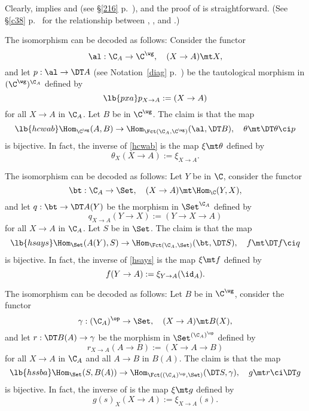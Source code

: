 \documentclass[12pt]{article}
\theoremstyle{remark}
\theoremstyle{definition}
\begin{document}
Clearly,  implies  and  (see \S\ref{216} p.~), and the proof of  is straightforward. (See \S\ref{c38} p.~ for the relationship between , , and .) 

The isomorphism  can be decoded as follows: Consider the functor 
$$
\al:\C_A\to\C^\wg,\quad(X\to A)\mt X,
$$ 
and let $p:\al\to\DT A$ (see Notation~\ref{diag} p.~) be the tautological morphism in $(\C^\wg)^{\C_A}$ defined by 
%
\begin{equation}\lb{pxa}
p_{X\to A}:=(X\to A)
\end{equation}
% 
for all $X\to A$ in $\C_A$. Let $B$ be in $\C^\wg$. The claim is that the map 
\begin{equation}\lb{hcwab}
\Hom_{\C^\wg}(A,B)\to\Hom_{\Fct(\C_A,\C^\wg)}(\al,\DT B),\quad\theta\mt\DT \theta\ci p
\end{equation} 
is bijective. In fact, the inverse of \eqref{hcwab} is the map $\xi\mt\theta$ defined by 
$$
\theta_X(X\to A):=\xi_{X\to A}.
$$

The isomorphism  can be decoded as follows: Let $Y$ be in $\C$, consider the functor 
$$
\bt:\C_A\to\Set,\quad(X\to A)\mt\Hom_\C(Y,X), 
$$ 
and let $q:\bt\to\DT A(Y)$ be the morphism in $\Set^{\C_A}$ defined by 
$$
q_{X\to A}(Y\to X):=(Y\to X\to A)
$$ 
for all $X\to A$ in $\C_A$. Let $S$ be in $\Set$. The claim is that the map 
\begin{equation}\lb{hsays}
\Hom_{\Set}(A(Y),S)\to\Hom_{\Fct(\C_A,\Set)}(\bt,\DT S),\quad f\mt\DT f\ci q
\end{equation} 
is bijective. In fact, the inverse of \eqref{hsays} is the map $\xi\mt f$ defined by 
$$
f(Y\to A):=\xi_{Y\to A}(\id_A).
$$

The isomorphism  can be decoded as follows: Let $B$ be in $\C^\wg$, consider the functor 
$$
\gamma:(\C_A)^{\op}\to\Set,\quad(X\to A)\mt B(X),
$$ 
and let $r:\DT B(A)\to\gamma$ be the morphism in $\Set^{(\C_A)^{\op}}$ defined by 
$$
r_{X\to A}(A\to B):=(X\to A\to B)
$$ 
for all $X\to A$ in $\C_A$ and all $A\to B$ in $B(A)$. The claim is that the map 
\begin{equation}\lb{hssba}
\Hom_{\Set}(S,B(A))\to\Hom_{\Fct((\C_A)^{\op},\Set)}(\DT S,\gamma),\quad g\mt r\ci\DT g
\end{equation} 
is bijective. In fact, the inverse of  is the map $\xi\mt g$ defined by 
$$
g(s)_X(X\to A):=\xi_{X\to A}(s).
$$

\end{document}
